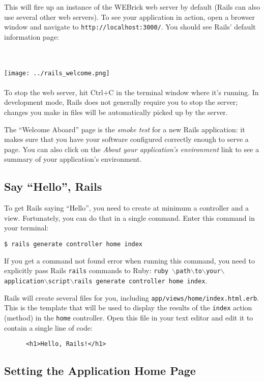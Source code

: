 \documentclass[10pt]{book}
\begin{document}
This will fire up an instance of the WEBrick web server by default (Rails can also use several other web servers). To see your application in action, open a browser window and navigate to \verb+http://localhost:3000/+. You should see Rails’ default information page:

\\ \\
\texttt{[image: ../rails\_welcome.png]}
\\ \\

To stop the web server, hit Ctrl+C in the terminal window where it’s running. In development mode, Rails does not generally require you to stop the server; changes you make in files will be automatically picked up by the server.

The “Welcome Aboard” page is the \emph{smoke test} for a new Rails application: it makes sure that you have your software configured correctly enough to serve a page. You can also click on the \emph{About your application’s environment} link to see a summary of your application’s environment.

\subsection{ Say “Hello”, Rails}

To get Rails saying “Hello”, you need to create at minimum a controller and a view. Fortunately, you can do that in a single command. Enter this command in your terminal:
\begin{verbatim}
$ rails generate controller home index
\end{verbatim}

If you get a command not found error when running this command, you need to explicitly pass Rails \texttt{rails} commands to Ruby: \texttt{ruby $\backslash$path$\backslash$to$\backslash$your$\backslash$application$\backslash$script$\backslash$rails generate controller home index}.

Rails will create several files for you, including \texttt{app/views/home/index.html.erb}. This is the template that will be used to display the results of the \texttt{index} action (method) in the \texttt{home} controller. Open this file in your text editor and edit it to contain a single line of code:

\verb+		<h1>Hello, Rails!</h1>+

\subsection{ Setting the Application Home Page}
\end{document}
